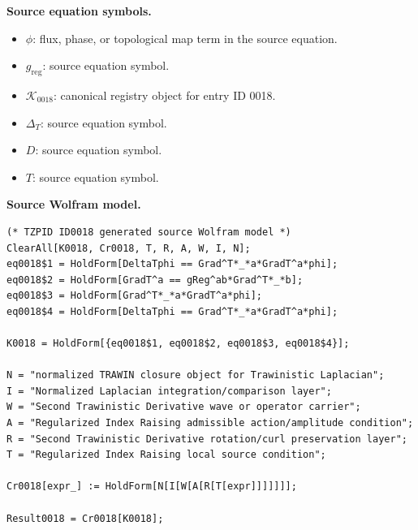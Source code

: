 \begin{minipage}[t]{0.49\linewidth}
\begingroup
\small
\raggedright
\textbf{Source equation symbols.}\par
\begin{itemize}[leftmargin=1.35em,itemsep=1pt,topsep=1pt,parsep=0pt]
    \item $\phi$: flux, phase, or topological map term in the source equation.
    \item $g_{\mathrm{reg}}$: source equation symbol.
    \item $\mathcal{K}_{0018}$: canonical registry object for entry ID 0018.
    \item $\Delta_{T}$: source equation symbol.
    \item $D$: source equation symbol.
    \item $T$: source equation symbol.
\end{itemize}
\endgroup
\end{minipage}\hfill
\begin{minipage}[t]{0.47\linewidth}
\begingroup
\scriptsize
\raggedright
\textbf{Source Wolfram model.}\par
\begin{Verbatim}[fontsize=\tiny,breaklines=true,breakanywhere=true]
(* TZPID ID0018 generated source Wolfram model *)
ClearAll[K0018, Cr0018, T, R, A, W, I, N];
eq0018$1 = HoldForm[DeltaTphi == Grad^T*_*a*GradT^a*phi];
eq0018$2 = HoldForm[GradT^a == gReg^ab*Grad^T*_*b];
eq0018$3 = HoldForm[Grad^T*_*a*GradT^a*phi];
eq0018$4 = HoldForm[DeltaTphi == Grad^T*_*a*GradT^a*phi];

K0018 = HoldForm[{eq0018$1, eq0018$2, eq0018$3, eq0018$4}];

N = "normalized TRAWIN closure object for Trawinistic Laplacian";
I = "Normalized Laplacian integration/comparison layer";
W = "Second Trawinistic Derivative wave or operator carrier";
A = "Regularized Index Raising admissible action/amplitude condition";
R = "Second Trawinistic Derivative rotation/curl preservation layer";
T = "Regularized Index Raising local source condition";

Cr0018[expr_] := HoldForm[N[I[W[A[R[T[expr]]]]]]];

Result0018 = Cr0018[K0018];
\end{Verbatim}
\endgroup
\end{minipage}

